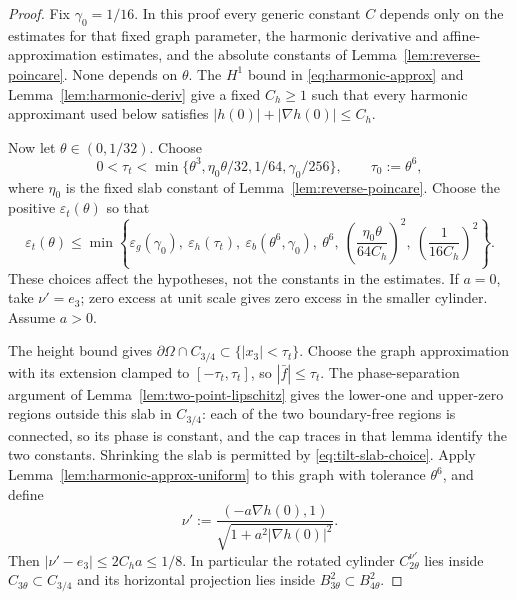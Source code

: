 \begin{proof}
Fix $\gamma_0=1/16$.  In this proof every generic constant $C$ depends only
on the estimates for that fixed graph parameter, the harmonic derivative
and affine-approximation estimates, and the absolute constants of
Lemma~\ref{lem:reverse-poincare}.  None depends on $\theta$.
The $H^1$ bound in \eqref{eq:harmonic-approx} and
Lemma~\ref{lem:harmonic-deriv} give a fixed $C_h\ge1$ such that every
harmonic approximant used below satisfies
$|h(0)|+|\nabla h(0)|\le C_h$.

Now let $\theta\in(0,1/32)$.  Choose
\begin{equation}\label{eq:tilt-slab-choice}
 0<\tau_t<\min\{\theta^3,\eta_0\theta/32,1/64,\gamma_0/256\},
 \qquad \tau_0:=\theta^6,
\end{equation}
where $\eta_0$ is the fixed slab constant of
Lemma~\ref{lem:reverse-poincare}.  Choose the positive
$\varepsilon_t(\theta)$ so that
\[
 \varepsilon_t(\theta)\le\min\left\{
 \varepsilon_g(\gamma_0),\ \varepsilon_h(\tau_t),\
 \varepsilon_b(\theta^6,\gamma_0),\ \theta^6,\
 \left(\frac{\eta_0\theta}{64C_h}\right)^2,\
 \left(\frac1{16C_h}\right)^2\right\}.
\]
These choices affect the hypotheses, not the constants in the estimates.
If $a=0$, take $\nu'=e_3$; zero excess at unit scale gives zero excess in
the smaller cylinder.  Assume $a>0$.

The height bound gives $\partial\Omega\cap C_{3/4}\subset\{|x_3|<\tau_t\}$.
Choose the graph approximation with its extension clamped to
$[-\tau_t,\tau_t]$, so $|\bar f|\le\tau_t$.  The phase-separation argument
of Lemma~\ref{lem:two-point-lipschitz} gives the lower-one and upper-zero
regions outside this slab in $C_{3/4}$: each of the two boundary-free
regions is connected, so its phase is constant, and the cap traces in that
lemma identify the two constants.  Shrinking the slab is permitted by
\eqref{eq:tilt-slab-choice}.  Apply
Lemma~\ref{lem:harmonic-approx-uniform} to this graph with tolerance
$\theta^6$, and define
\begin{equation}\label{eq:new-normal}
  \nu':=\frac{(-a\nabla h(0),1)}{\sqrt{1+a^2|\nabla h(0)|^2}}.
\end{equation}
Then $|\nu'-e_3|\le2C_ha\le1/8$.  In particular the rotated cylinder
$C_{2\theta}^{\nu'}$ lies inside $C_{3\theta}\subset C_{3/4}$ and its
horizontal projection lies inside $B^2_{3\theta}\subset B^2_{4\theta}$.


\end{proof}
